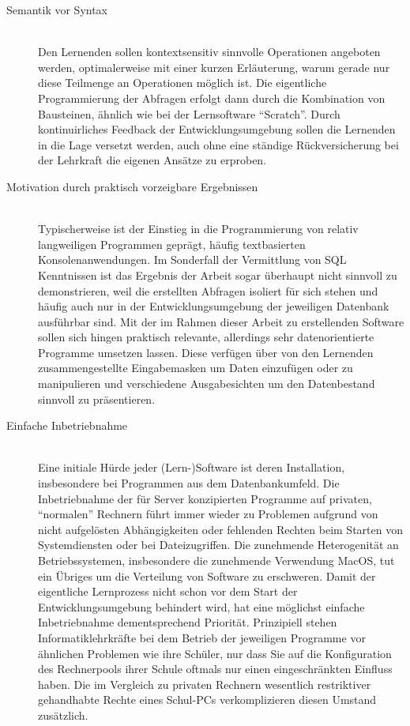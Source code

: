 \documentclass[paper=a4,fontsize=11pt,parskip=half]{scrartcl}
\begin{document}
\begin{description}
\item[Semantik vor Syntax] \hfill\\
  Den Lernenden sollen kontextsensitiv sinnvolle Operationen angeboten werden, optimalerweise mit einer kurzen Erläuterung, warum gerade nur diese Teilmenge an Operationen möglich ist. Die eigentliche Programmierung der Abfragen erfolgt dann durch die Kombination von Bausteinen, ähnlich wie bei der Lernsoftware ``Scratch''. Durch kontinuirliches Feedback der Entwicklungsumgebung sollen die Lernenden in die Lage versetzt werden, auch ohne eine ständige Rückversicherung bei der Lehrkraft die eigenen Ansätze zu erproben.
\item[Motivation durch praktisch vorzeigbare Ergebnissen] \hfill\\
  Typischerweise ist der Einstieg in die Programmierung von relativ langweiligen Programmen geprägt, häufig textbasierten Konsolenanwendungen. Im Sonderfall der Vermittlung von SQL Kenntnissen ist das Ergebnis der Arbeit sogar überhaupt nicht sinnvoll zu demonstrieren, weil die erstellten Abfragen isoliert für sich stehen und häufig auch nur in der Entwicklungsumgebung der jeweiligen Datenbank ausführbar sind. Mit der im Rahmen dieser Arbeit zu erstellenden Software sollen sich hingen praktisch relevante, allerdings sehr datenorientierte Programme umsetzen lassen. Diese verfügen über von den Lernenden zusammengestellte Eingabemasken um Daten einzufügen oder zu manipulieren und verschiedene Ausgabesichten um den Datenbestand sinnvoll zu präsentieren.
\item[Einfache Inbetriebnahme] \hfill \\
  Eine initiale Hürde jeder (Lern-)Software ist deren Installation, insbesondere bei Programmen aus dem Datenbankumfeld. Die Inbetriebnahme der für Server konzipierten Programme auf privaten, ``normalen'' Rechnern führt immer wieder zu Problemen aufgrund von nicht aufgelösten Abhängigkeiten oder fehlenden Rechten beim Starten von Systemdiensten oder bei Dateizugriffen. Die zunehmende Heterogenität an Betriebssystemen, insbesondere die zunehmende Verwendung MacOS, tut ein Übriges um die Verteilung von Software zu erschweren. Damit der eigentliche Lernprozess nicht schon vor dem Start der Entwicklungsumgebung behindert wird, hat eine möglichst einfache Inbetriebnahme dementsprechend Priorität. Prinzipiell stehen Informatiklehrkräfte bei dem Betrieb der jeweiligen Programme vor ähnlichen Problemen wie ihre Schüler, nur dass Sie auf die Konfiguration des Rechnerpools ihrer Schule oftmals nur einen eingeschränkten Einfluss haben. Die im Vergleich zu privaten Rechnern wesentlich restriktiver gehandhabte Rechte eines Schul-PCs verkomplizieren diesen Umstand zusätzlich.

\end{description}
\end{document}
